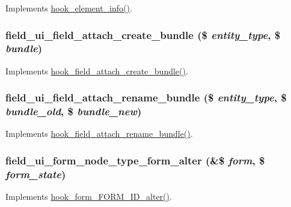 \label{field__ui_8module_ab692b5bd1afde931919087fa5b172da5}
Implements \hyperlink{group__hooks_ga3c5182432eddc82f8b7845e66a365d51}{hook\_\-element\_\-info()}. \hypertarget{field__ui_8module_addc5ea31872203f8a9419766d55d484a}{
\subsubsection[{field\_\-ui\_\-field\_\-attach\_\-create\_\-bundle}]{\setlength{\rightskip}{0pt plus 5cm}field\_\-ui\_\-field\_\-attach\_\-create\_\-bundle (\$ {\em entity\_\-type}, \/  \$ {\em bundle})}}
\label{field__ui_8module_addc5ea31872203f8a9419766d55d484a}
Implements \hyperlink{group__field__attach_gad2e99b8b55c106c289a8241db00f0f30}{hook\_\-field\_\-attach\_\-create\_\-bundle()}. \hypertarget{field__ui_8module_a2014163f1e6ea6b59d17cefe5534d596}{
\subsubsection[{field\_\-ui\_\-field\_\-attach\_\-rename\_\-bundle}]{\setlength{\rightskip}{0pt plus 5cm}field\_\-ui\_\-field\_\-attach\_\-rename\_\-bundle (\$ {\em entity\_\-type}, \/  \$ {\em bundle\_\-old}, \/  \$ {\em bundle\_\-new})}}
\label{field__ui_8module_a2014163f1e6ea6b59d17cefe5534d596}
Implements \hyperlink{group__field__attach_gaf218d913150bda6004d5d8e112d3174a}{hook\_\-field\_\-attach\_\-rename\_\-bundle()}. \hypertarget{field__ui_8module_ab23871fe4a263c0c11da6f5910525545}{
\subsubsection[{field\_\-ui\_\-form\_\-node\_\-type\_\-form\_\-alter}]{\setlength{\rightskip}{0pt plus 5cm}field\_\-ui\_\-form\_\-node\_\-type\_\-form\_\-alter (\&\$ {\em form}, \/  \$ {\em form\_\-state})}}
\label{field__ui_8module_ab23871fe4a263c0c11da6f5910525545}
Implements \hyperlink{group__hooks_ga8d4a4089551493d55911bd5c4f218264}{hook\_\-form\_\-FORM\_\-ID\_\-alter()}.


